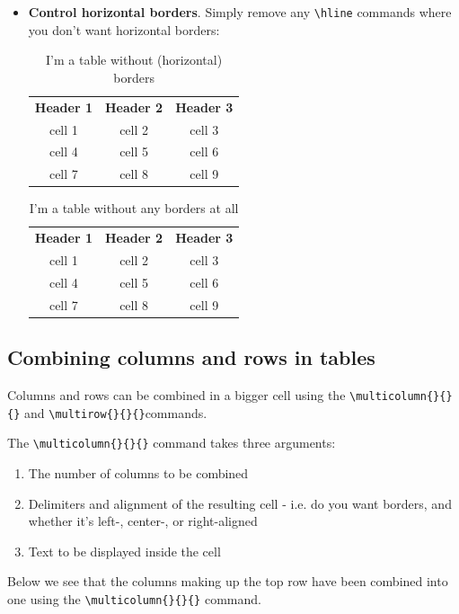 \documentclass{article}
\begin{document}
\begin{itemize}
\item \textbf{Control horizontal borders}. Simply remove any \verb|\hline| commands where you don't want horizontal borders:
\begin{table}[h!] 
\caption*{\large{I'm a table without (horizontal) borders}} 
\centering
\begin{tabular}{|c|c|c|}
\textbf{Header 1} & \textbf{Header 2} & \textbf{Header 3} \\
cell 1 & cell 2 & cell 3 \\
cell 4 & cell 5 & cell 6 \\
cell 7 & cell 8 & cell 9 \\ %
\end{tabular}
\end{table}

\begin{table}[h!] 
\caption*{\large{I'm a table without any borders at all}} 
\centering
\begin{tabular}{c c c}
\textbf{Header 1} & \textbf{Header 2} & \textbf{Header 3} \\
cell 1 & cell 2 & cell 3 \\
cell 4 & cell 5 & cell 6 \\
cell 7 & cell 8 & cell 9 \\
\end{tabular}
\end{table}

\end{itemize}

\subsection{Combining columns and rows in tables}
Columns and rows can be combined in a bigger cell using the \verb|\multicolumn{}{}{}| and \verb|\multirow{}{}{}|commands.

\noindent The \verb|\multicolumn{}{}{}| command takes three arguments:
\begin{enumerate}
    \item The number of columns to be combined 
    \item Delimiters and alignment of the resulting cell - i.e. do you want borders, and whether it's left-, center-, or right-aligned
    \item Text to be displayed inside the cell 
\end{enumerate}
Below we see that the columns making up the top row have been combined into one using the \verb|\multicolumn{}{}{}| command.
\end{document}
